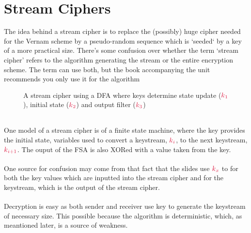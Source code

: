 \section{Stream Ciphers}
The idea behind a stream cipher is to replace the (possibly) huge cipher needed for the Vernam scheme by a pseudo-random sequence which is `seeded` by a key of a more practical size. There's some confusion over whether the term `stream cipher' refers to the algorithm generating the stream or the entire encryption scheme. The term can use both, but the book accompanying the unit recommends you only use it for the algorithm
\begin{figure}
    \caption{A stream cipher using a DFA where keys determine state update ($\csubk{1}$), initial state ($\csubk{2}$) and output filter ($\csubk{3}$)}
\end{figure}
\\
One model of a stream cipher is of a finite state machine, where the key provides the initial state, variables used to convert a keystream, $\csubk{i}$, to the next keystream, $\csubk{i+1}$. The ouput of the FSA is also XORed with a value taken from the key.\\
\\
One source for confusion may come from that fact that the slides use $\csubk{x}$ to for both the key values which are inputted into the stream cipher and for the keystream, which is the output of the stream cipher.\\
\\
Decryption is easy as both sender and receiver use key to generate the keystream of necessary size. This possible because the algorithm is deterministic, which, as meantioned later, is a source of weakness.
